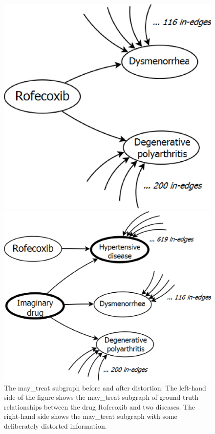 \begin{figure}[tbh]
\begin{minipage}[c]{0.49\textwidth}\centering
\includegraphics[width=.6\textwidth]{fig/may_treat.eps}
\end{minipage}
\begin{minipage}[c]{0.49\textwidth}\centering
\includegraphics[width=.8\textwidth]{fig/may_treat_augmented.eps}
\end{minipage}
\caption[The may\_treat subgraph]{\label{fig:may_treat} The may\_treat subgraph before and after distortion: The left-hand side of the figure shows the may\_treat subgraph of ground truth relationships between the drug Rofecoxib and two diseases. The right-hand side shows the may\_treat subgraph with some deliberately distorted information.}
\end{figure}


